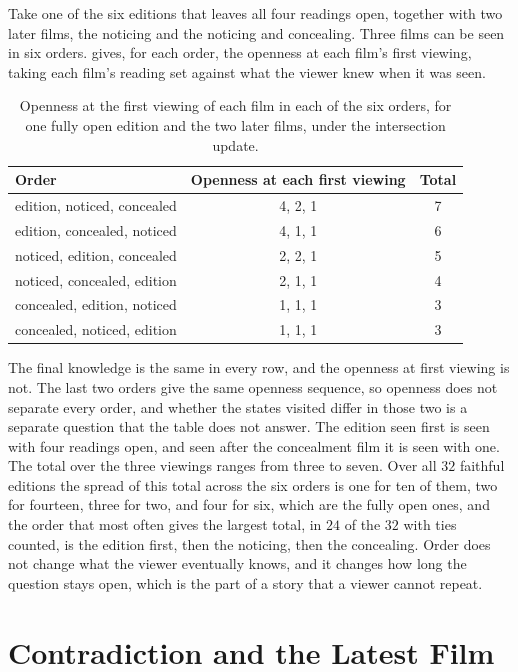 \documentclass[11pt,twoside,openright]{book}
\theoremstyle{plain}
\theoremstyle{definition}
\theoremstyle{remark}
\begin{document}
Take one of the six editions that leaves all four readings open, together with two later films, the noticing and the noticing and concealing. Three films can be seen in six orders.  gives, for each order, the openness at each film's first viewing, taking each film's reading set against what the viewer knew when it was seen.

\begin{table}[ht]
\centering
\begin{tabular}{@{}lcc@{}}
\toprule
Order & Openness at each first viewing & Total\\
\midrule
edition, noticed, concealed & 4, 2, 1 & 7\\
edition, concealed, noticed & 4, 1, 1 & 6\\
noticed, edition, concealed & 2, 2, 1 & 5\\
noticed, concealed, edition & 2, 1, 1 & 4\\
concealed, edition, noticed & 1, 1, 1 & 3\\
concealed, noticed, edition & 1, 1, 1 & 3\\
\bottomrule
\end{tabular}
\caption{Openness at the first viewing of each film in each of the six orders, for one fully open edition and the two later films, under the intersection update.}\label{tab:order14}
\end{table}

The final knowledge is the same in every row, and the openness at first viewing is not. The last two orders give the same openness sequence, so openness does not separate every order, and whether the states visited differ in those two is a separate question that the table does not answer. The edition seen first is seen with four readings open, and seen after the concealment film it is seen with one. The total over the three viewings ranges from three to seven. Over all $32$ faithful editions the spread of this total across the six orders is one for ten of them, two for fourteen, three for two, and four for six, which are the fully open ones, and the order that most often gives the largest total, in $24$ of the $32$ with ties counted, is the edition first, then the noticing, then the concealing. Order does not change what the viewer eventually knows, and it changes how long the question stays open, which is the part of a story that a viewer cannot repeat.

\section{Contradiction and the Latest Film}\label{sec:contra14}
\end{document}
